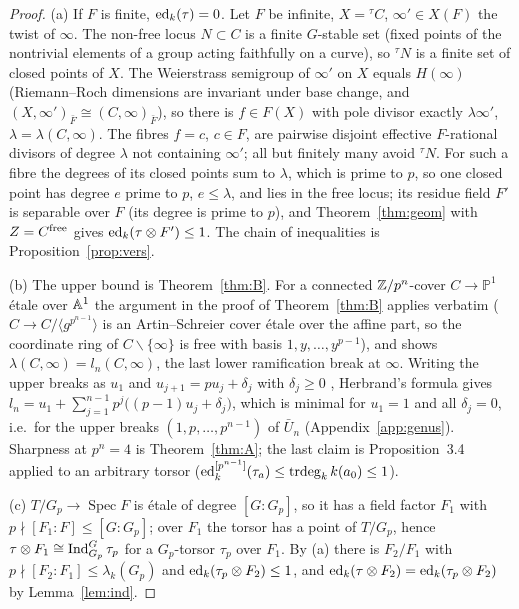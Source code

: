\begin{proof}
(a) If $F$ is finite, $\operatorname{ed}_k(\tau)=0$. Let $F$ be infinite, $X={}^\tau C$, $\infty'\in X(F)$
the twist of $\infty$. The non-free locus $N\subset C$ is a finite $G$-stable set (fixed
points of the nontrivial elements of a group acting faithfully on a curve), so ${}^\tau N$
is a finite set of closed points of $X$. The Weierstrass semigroup of $\infty'$ on $X$
equals $H(\infty)$ (Riemann--Roch dimensions are invariant under base change, and
$(X,\infty')_{\bar F}\cong(C,\infty)_{\bar F}$), so there is $f\in F(X)$ with pole divisor
exactly $\lambda\infty'$, $\lambda=\lambda(C,\infty)$. The fibres $f=c$, $c\in F$, are
pairwise disjoint effective $F$-rational divisors of degree $\lambda$ not containing
$\infty'$; all but finitely many avoid ${}^\tau N$. For such a fibre the degrees of its
closed points sum to $\lambda$, which is prime to $p$, so one closed point has degree
$e$ prime to $p$, $e\le\lambda$, and lies in the free locus; its residue field $F'$ is
separable over $F$ (its degree is prime to $p$), and Theorem~\ref{thm:geom} with
$Z=C^{\rm free}$ gives $\operatorname{ed}_k(\tau\otimes F')\le1$. The chain of inequalities is
Proposition~\ref{prop:vers}.

(b) The upper bound is Theorem~\ref{thm:B}. For a connected $\mathbb Z/p^n$-cover
$C\to\mathbb P^1$ \'etale over $\mathbb A^1$ the argument in the proof of Theorem~\ref{thm:B}
applies verbatim ($C\to C/\langle g^{p^{n-1}}\rangle$ is an Artin--Schreier cover \'etale
over the affine part, so the coordinate ring of $C\smallsetminus\{\infty\}$ is free with
basis $1,y,\dots,y^{p-1}$), and shows $\lambda(C,\infty)=l_n(C,\infty)$, the last lower
ramification break at $\infty$. Writing the upper breaks as $u_1$ and
$u_{j+1}=pu_j+\delta_j$ with $\delta_j\ge0$ \cite{Ga,Th}, Herbrand's formula gives
$l_n=u_1+\sum_{j=1}^{n-1}p^j\bigl((p-1)u_j+\delta_j\bigr)$, which is minimal for
$u_1=1$ and all $\delta_j=0$, i.e.\ for the upper breaks $(1,p,\dots,p^{n-1})$ of
$\bar U_n$ (Appendix~\ref{app:genus}). Sharpness at $p^n=4$ is Theorem~\ref{thm:A}; the
last claim is Proposition~3.4 applied to an arbitrary torsor ($\operatorname{ed}^{[p^{n-1}]}_k(\tau_a)\le
\operatorname{trdeg}_kk(a_0)\le1$).

(c) $T/G_p\to\operatorname{Spec}F$ is \'etale of degree $[G:G_p]$, so it has a field
factor $F_1$ with $p\nmid[F_1:F]\le[G:G_p]$; over $F_1$ the torsor has a point of
$T/G_p$, hence $\tau\otimes F_1\cong\operatorname{Ind}_{G_p}^G\tau_p$ for a $G_p$-torsor $\tau_p$ over
$F_1$. By (a) there is $F_2/F_1$ with $p\nmid[F_2:F_1]\le\lambda_k(G_p)$ and
$\operatorname{ed}_k(\tau_p\otimes F_2)\le1$, and $\operatorname{ed}_k(\tau\otimes F_2)=\operatorname{ed}_k(\tau_p\otimes F_2)$ by
Lemma~\ref{lem:ind}.
\end{proof}

